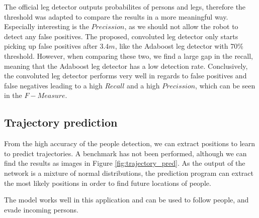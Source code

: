 The official leg detector outputs probabilites of persons and legs, therefore the threshold was adapted to compare the results in a more meaningful way. Especially interesting is the $Precission$, as we should not allow the robot to detect any false positives. The proposed, convoluted leg detector only starts picking up false positives after $3.4 m$, like the Adaboost leg detector with 70\% threshold. However, when comparing these two, we find a large gap in the recall, meaning that the Adaboost leg detector has a low detection rate.
Conclusively, the convoluted leg detector performs very well in regards to false positives and false negatives leading to a high $Recall$ and a high $Precission$, which can be seen in the $F-Measure$.


\subsection{Trajectory prediction}

From the high accuracy of the people detection, we can extract positions to learn to predict trajectories. A benchmark has not been performed, although we can find the results as images in Figure \ref{fig:trajectory_pred}. As the output of the network is a mixture of normal distributions, the prediction program can extract the most likely positions in order to find future locations of people.

The model works well in this application and can be used to follow people, and evade incoming persons. 
